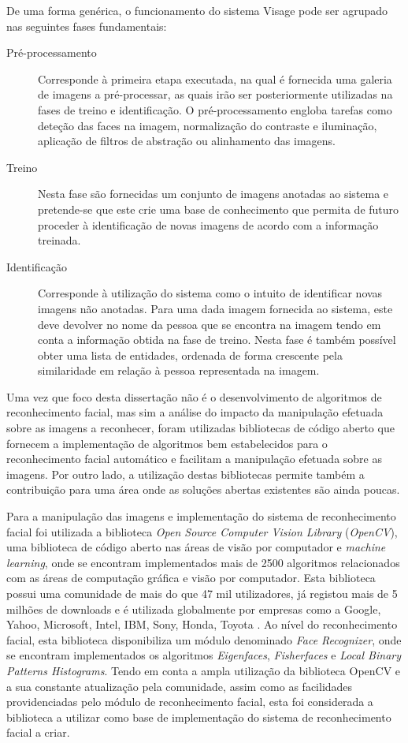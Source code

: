 De uma forma genérica, o funcionamento do sistema Visage pode ser agrupado nas seguintes fases fundamentais:
\begin{description}
\item[Pré-processamento] Corresponde à primeira etapa executada, na qual é fornecida uma galeria de imagens a pré-processar, as quais irão ser posteriormente utilizadas na fases de treino e identificação. O pré-processamento engloba tarefas como deteção das faces na imagem, normalização do contraste e iluminação, aplicação de filtros de abstração ou alinhamento das imagens.
\item[Treino] Nesta fase são fornecidas um conjunto de imagens anotadas ao sistema e pretende-se que este crie uma base de conhecimento que permita de futuro proceder à identificação de novas imagens de acordo com a informação treinada.
\item[Identificação] Corresponde à utilização do sistema como o intuito de identificar novas imagens não anotadas. Para uma dada imagem fornecida ao sistema, este deve devolver no nome da pessoa que se encontra na imagem tendo em conta a informação obtida na fase de treino. Nesta fase é também possível obter uma lista de entidades, ordenada de forma crescente pela similaridade em relação à pessoa representada na imagem.
\end{description}

Uma vez que foco desta dissertação não é o desenvolvimento de algoritmos de reconhecimento facial, mas sim a análise do impacto da manipulação efetuada sobre as imagens a reconhecer, foram utilizadas bibliotecas de código aberto que fornecem a implementação de algoritmos bem estabelecidos para o reconhecimento facial automático e facilitam a manipulação efetuada sobre as imagens. Por outro lado, a utilização destas bibliotecas permite também a contribuição para uma área onde as soluções abertas existentes são ainda poucas.

Para a manipulação das imagens e implementação do sistema de reconhecimento facial foi utilizada a biblioteca \textit{Open Source Computer Vision Library} (\textit{OpenCV}), uma biblioteca de código aberto nas áreas de visão por computador e \textit{machine learning}, onde se encontram implementados mais de 2500 algoritmos relacionados com as áreas de computação gráfica e visão por computador. Esta biblioteca possui uma comunidade de mais do que 47 mil utilizadores, já registou mais de 5 milhões de downloads e é utilizada globalmente por empresas como a Google, Yahoo, Microsoft, Intel, IBM, Sony, Honda, Toyota \cite{Team}. Ao nível do reconhecimento facial, esta biblioteca disponibiliza um módulo denominado \textit{Face Recognizer}, onde se encontram implementados os algoritmos \textit{Eigenfaces}, \textit{Fisherfaces} e \textit{Local Binary Patterns Histograms}. Tendo em conta a ampla utilização da biblioteca OpenCV e a sua constante atualização pela comunidade, assim como as facilidades providenciadas pelo módulo de reconhecimento facial, esta foi considerada a biblioteca a utilizar como base de implementação do sistema de reconhecimento facial a criar.

